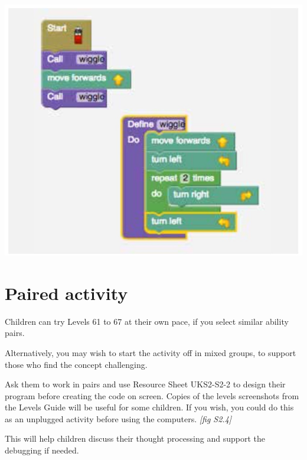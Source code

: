 \documentclass{../../../lessonplan}
\begin{document}
\begin{lessonplan}
\includegraphics[width=\linewidth]{model.jpg}

\section*{Paired activity}

Children can try Levels 61 to 67 at their own pace, if you select similar ability pairs.

Alternatively, you may wish to start the activity off in mixed groups, to support those who find the concept challenging.

Ask them to work in pairs and use Resource Sheet UKS2-S2-2 to design their program before creating the code on screen.
Copies of the levels screenshots from the Levels Guide will be useful for some children.
If you wish, you could do this as an unplugged activity before using the computers. \textit{[fig S2.4]}


This will help children discuss their thought processing and support the debugging if needed.

\end{lessonplan}
\end{document}
